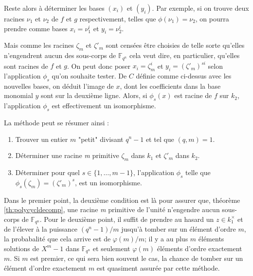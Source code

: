 \documentclass[a4paper]{article} %
\numberwithin{section}{part}
\numberwithin{equation}{section}
\newcommand\nroot[1]{\textit{#1}\up{\textit{ième}}}
\newcommand\GF[1]{\mathbb{F}_{#1}}
\begin{document}
Reste alors à déterminer les bases $(x_i)$ et $(y_i)$. Par exemple, si on trouve
deux racines $\nu_1$ et $\nu_2$ de $f$ et $g$ respectivement, telles que 
$\phi(\nu_1) = \nu_2$, on pourra prendre comme bases $x_i = \nu_1^i$ et 
$y_i = \nu_2^i$.\par
Mais comme les racines $\zeta_m$ et $\zeta'_m$ sont censées être choisies de 
telle sorte qu'elles n'engendrent aucun des sous-corps de $\GF{q^n}$ cela veut 
dire, en particulier, qu'elles sont racines de $f$ et $g$. On peut donc poser 
$x_i = \zeta_m^i$ et $y_i = (\zeta'_m)^{si}$ selon l'application $\phi_s$ qu'on 
souhaite tester. De $C$ définie comme ci-dessus avec les nouvelles bases,
on déduit l'image de $x$, dont les coefficients dans la base monomial $y$ sont 
sur la deuxième ligne. Alors, si $\phi_s(x)$ est racine de $f$ sur $k_2$,
l'application $\phi_s$ est effectivement un isomorphisme.\par
\vspace{0.3cm}
La méthode peut se résumer ainsi :
\vspace{0.3cm}
\begin{enumerate}[1.]
\item Trouver un entier $m$ "petit" divisant $q^n - 1$ et tel que 
$(q,m) = 1$. 

\item Déterminer une racine \nroot{m} primitive $\zeta_m$ dans $k_1$ et
$\zeta'_m$ dans $k_2$.

\item  Déterminer pour quel $s\in \lbrace{1,\dots,m-1}\rbrace$, l'application
$\phi_s$ telle que $\phi_s(\zeta_m) = (\zeta'_m)^s$, est un isomorphisme.
\end{enumerate}
\vspace{0.3cm}
Dans le premier point, la deuxième condition est là pour assurer que, théorème
\ref{th:polycycldecomp}, une racine \nroot{m} primitive de l'unité 
n'engendre aucun sous-corps de $\GF{q^n}$. Pour le deuxième point, il suffit de 
prendre au hasard un $z\in k_1^{\times}$ et de l'élever à la puissance 
$(q^n - 1)/m$ jusqu'à tomber sur un élément d'ordre $m$, la probabalité 
que cela arrive est de $\varphi(m)/m$; il y a au plus $m$ éléments solutions de
$X^m - 1$ dans $\GF{q^n}$ et seulement $\varphi(m)$ éléments d'ordre exactement
$m$. Si $m$ est premier, ce qui sera bien souvent le cas, la chance de tomber
sur un élément d'ordre exactement $m$ est quasiment assurée par cette méthode.
\end{document}
